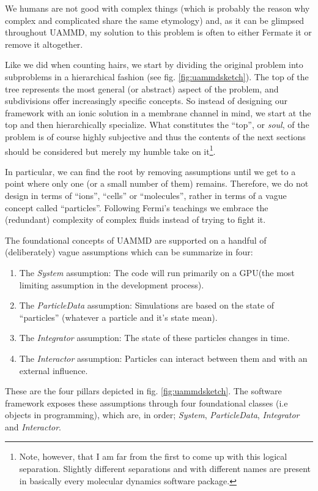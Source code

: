 \documentclass[ twoside,openright,titlepage,numbers=noenddot,%
headinclude,footinclude,cleardoublepage=empty,abstract=on,
BCOR=5mm,paper=a4,fontsize=11pt, dvipsnames
]{scrreprt}
\newcommand{\uammd}{\gls{UAMMD}\xspace}
\newcommand{\gpu}{\gls{GPU}\xspace}
\begin{document}
We humans are not good with complex things (which is probably the reason why complex and complicated share the same etymology) and, as it can be glimpsed throughout \uammd, my solution to this problem is often to either Fermate it or remove it altogether.

Like we did when counting hairs, we start by dividing the original problem into subproblems in a hierarchical fashion (see fig. \ref{fig:uammdsketch}). The top of the tree represents the most general (or abstract) aspect of the problem, and subdivisions offer increasingly specific concepts. So instead of designing our framework with an ionic solution in a membrane channel in mind, we start at the top and then hierarchically specialize. What constitutes the ``top'', or \emph{soul}, of the problem is of course highly subjective and thus the contents of the next sections should be considered but merely my humble take on it\footnote{Note, however, that I am far from the first to come up with this logical separation. Slightly different separations and with different names are present in basically every molecular dynamics software package.}.

In particular, we can find the root by removing assumptions until we get to a point where only one (or a small number of them) remains. Therefore, we do not design in terms of ``ions'', ``cells'' or ``molecules'', rather in terms of a vague concept called ``particles''.
Following Fermi's teachings we embrace the (redundant) complexity of complex fluids instead of trying to fight it.


The foundational concepts of \uammd are supported on a handful of (deliberately) vague assumptions which can be summarize in four:
\begin{enumerate}[label=\textbf{S.\arabic*}]
\item The \emph{System} assumption: The code will run primarily on a \gpu (the most limiting assumption in the development process).
\item The \emph{ParticleData} assumption: Simulations are based on the state of ``particles'' (whatever a particle and it's state mean).
\item The \emph{Integrator} assumption: The state of these particles changes in time.
\item The \emph{Interactor} assumption: Particles can interact between them and with an external influence.
\end{enumerate}
These are the four pillars depicted in fig. \ref{fig:uammdsketch}. The software framework exposes these assumptions through four foundational classes (i.e objects in programming), which are, in order; \emph{System}, \emph{ParticleData}, \emph{Integrator} and \emph{Interactor}.
\end{document}
